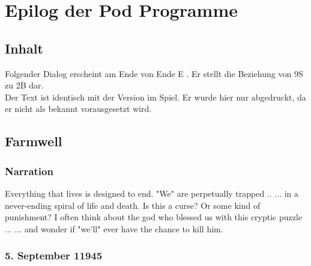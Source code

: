 %
%
%
%
\newpage


\chapter{Epilog der Pod Programme}

\section{Inhalt}
Folgender Dialog erscheint am Ende von \dq Ende E \dq .  Er stellt die Beziehung von 9S zu 2B dar. 	\\
 Der Text ist identisch mit der Version im Spiel. Er wurde hier nur abgedruckt, da er nicht als bekannt vorausgesetzt wird. 


\section{Farmwell}
\subsection{Narration}

\begin{play}
	  Everything that lives is designed to end.
	  "We" are perpetually trapped ..
	  ... in a never-ending spiral of life and death.
	  Is this a curse?
	  Or some kind of punishment?
	   I often think about the god who blessed us with this cryptic puzzle ...
	  ... and wonder if "we'll" ever have the chance to kill him.
\end{play}

\subsection{5. September 11945}

